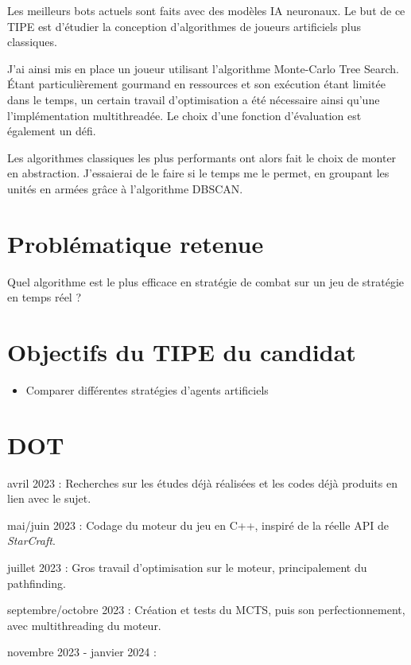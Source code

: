 \documentclass[a4paper, 12pt]{article}
\begin{document}
Les meilleurs bots actuels sont faits avec des modèles IA neuronaux.
Le but de ce TIPE est d'étudier la conception d'algorithmes de joueurs artificiels plus classiques.

J'ai ainsi mis en place un joueur utilisant l'algorithme Monte-Carlo Tree Search.
Étant particulièrement gourmand en ressources et son exécution étant limitée dans le temps,
un certain travail d'optimisation a été nécessaire ainsi qu'une l'implémentation multithreadée.
Le choix d'une fonction d'évaluation est également un défi.\cite{MCTSRTS}\cite{MCTStactical}

Les algorithmes classiques les plus performants ont alors fait le choix de monter en abstraction.
J'essaierai de le faire si le temps me le permet, en groupant les unités en armées grâce à l'algorithme DBSCAN.
\cite{dbscan}\cite{combatmodel}


\section*{Problématique retenue}
Quel algorithme est le plus efficace en stratégie de combat sur un jeu de stratégie en temps réel ?

\section*{Objectifs du TIPE du candidat}
\begin{itemize}
 \item Comparer différentes stratégies d'agents artificiels
\end{itemize}





\section*{DOT}
\begin{enumerate}[label=\textbf{[\arabic*]}]
    \item avril 2023 : Recherches sur les études déjà réalisées et les codes déjà produits en lien avec le sujet.
    \item mai/juin 2023 : Codage du moteur du jeu en C++, inspiré de la réelle API de \emph{StarCraft}.
    \item juillet 2023 : Gros travail d'optimisation sur le moteur, principalement du pathfinding.
    \item septembre/octobre 2023 : Création et tests du MCTS, puis son perfectionnement, avec multithreading du moteur.
    \item novembre 2023 - janvier 2024 :
\end{enumerate}
\end{document}
